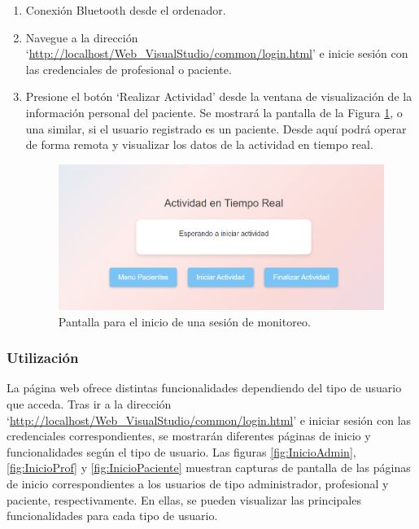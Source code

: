 \begin{enumerate}
    \item Conexión Bluetooth desde el ordenador.
    \item Navegue a la dirección \\`\href{http://localhost/Web\_VisualStudio/common/login.html}{http://localhost/Web\_VisualStudio/common/login.html}' e inicie sesión con las credenciales de profesional o paciente.
    \item Presione el botón `Realizar Actividad' desde la ventana de visualización de la información personal del paciente. Se mostrará la pantalla de la Figura \ref{fig:RealizarActividad}, o una similar, si el usuario registrado es un paciente. Desde aquí podrá operar de forma remota y visualizar los datos de la actividad en tiempo real.
    \begin{figure}[h]
        \centering
        \includegraphics[width=1\textwidth]{img/B3_Manual/RealizarActividad.png}
        \caption{Pantalla para el inicio de una sesión de monitoreo.}
        \label{fig:RealizarActividad}
    \end{figure}
\end{enumerate}

\subsubsection{Utilización}
La página web ofrece distintas funcionalidades dependiendo del tipo de usuario que acceda.
Tras ir a la dirección\\ `\href{http://localhost/Web\_VisualStudio/common/login.html}{http://localhost/Web\_VisualStudio/common/login.html}' e iniciar sesión con las credenciales correspondientes, se mostrarán diferentes páginas de inicio y funcionalidades según el tipo de usuario. Las figuras \ref{fig:InicioAdmin}, \ref{fig:InicioProf} y \ref{fig:InicioPaciente} muestran capturas de pantalla de las páginas de inicio correspondientes a los usuarios de tipo administrador, profesional y paciente, respectivamente. En ellas, se pueden visualizar las principales funcionalidades para cada tipo de usuario.

